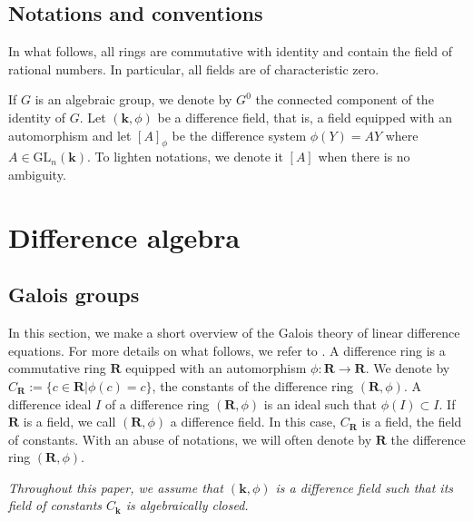 \documentclass[a4paper,11pt]{amsart}
\newcommand{\GL}{\operatorname{GL}}
\def\k{\mathbf{k}}
\def\Rb{\mathbf{R}}
\def\GL{\mathrm{GL}}
\begin{document}
\subsection*{Notations and conventions} In what follows,  all rings are commutative with identity and contain the field of rational numbers.  In particular, all fields are of characteristic zero. 

If $G$ is an algebraic group, we denote by $G^0$ the connected component of the identity of $G$.
Let $(\k,\phi)$ be a difference field, that is, a field equipped with an automorphism  and let $[A]_{\phi}$ be the difference system $\phi(Y)=AY$ where $A\in\GL_n\left(\k\right)$. To lighten notations, we denote it $[A]$ when there is no ambiguity. 



\section{Difference algebra}
\label{sec:diffceAlgebra}
\subsection{Galois groups}
\label{sec:GaloisGp}


In this section, we make a short overview of the Galois theory of linear difference equations.  
For more details on what follows, we refer to \cite[Chapter~1]{van2006galois}.
A difference ring is a commutative ring $\Rb$ equipped with an automorphism $\phi : \Rb\rightarrow \Rb$. We denote by $C_{\Rb}:= \{c\in \Rb| \phi(c)=c\}$, the constants of the difference ring $(\Rb,\phi)$. A difference ideal $I$ of a difference ring $(\Rb,\phi)$ is an ideal such that $\phi(I)\subset I$.  If $\Rb$ is a field, we call $(\Rb,\phi)$ a difference field. In this case, $C_{\Rb}$ is a field, the field of constants. 
With an abuse of notations, we will often denote by $\Rb$ the difference ring $(\Rb,\phi)$. 

\medskip

\emph{Throughout this paper, we assume that $(\k,\phi)$ is a difference field such that its field of constants $C_{\k}$ is algebraically closed.}

\medskip
\end{document}
